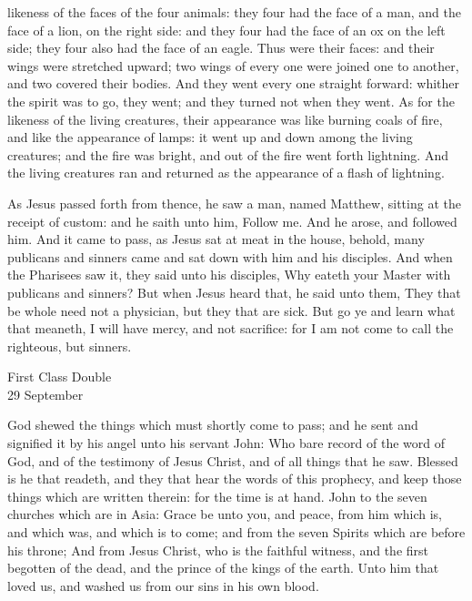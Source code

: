  likeness of the faces of the four animals: they four had the face of a man, and the face of a lion, on the right side: and they four had the face of an ox on the left side; they four also had the face of an eagle. Thus were their faces: and their wings were stretched upward; two wings of every one were joined one to another, and two covered their bodies. And they went every one straight forward: whither the spirit was to go, they went; and they turned not when they went. As for the likeness of the living creatures, their appearance was like burning coals of fire, and like the appearance of lamps: it went up and down among the living creatures; and the fire was bright, and out of the fire went forth lightning. And the living creatures ran and returned as the appearance of a flash of lightning.

 As Jesus passed forth from thence, he saw a man, named Matthew, sitting at the receipt of custom: and he saith unto him, Follow me. And he arose, and followed him. And it came to pass, as Jesus sat at meat in the house, behold, many publicans and sinners came and sat down with him and his disciples. And when the Pharisees saw it, they said unto his disciples, Why eateth your Master with publicans and sinners? But when Jesus heard that, he said unto them, They that be whole need not a physician, but they that are sick. But go ye and learn what that meaneth, I will have mercy, and not sacrifice: for I am not come to call the righteous, but sinners.

\begin{inhead}
    {First Class Double\\
29 September}
\end{inhead}


 God shewed the things which must shortly come to pass; and he sent and signified it by his angel unto his servant John: Who bare record of the word of God, and of the testimony of Jesus Christ, and of all things that he saw. Blessed is he that readeth, and they that hear the words of this prophecy, and keep those things which are written therein: for the time is at hand. John to the seven churches which are in Asia: Grace be unto you, and peace, from him which is, and which was, and which is to come; and from the seven Spirits which are before his throne; And from Jesus Christ, who is the faithful witness, and the first begotten of the dead, and the prince of the kings of the earth. Unto him that loved us, and washed us from our sins in his own blood.

